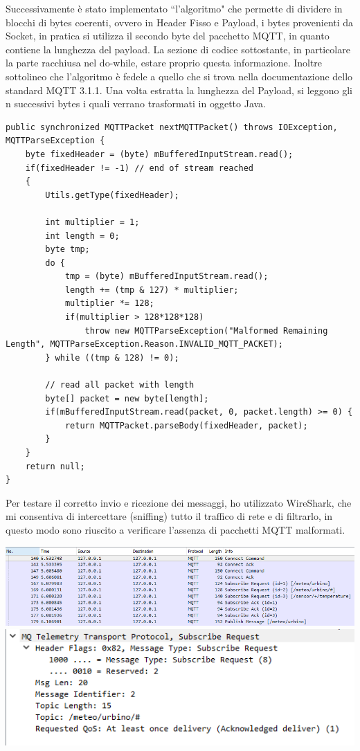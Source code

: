 \documentclass{article}
\begin{document}
Successivamente è stato implementato ``l'algoritmo" che permette di dividere in blocchi di bytes coerenti, ovvero in Header Fisso e Payload, i bytes provenienti da Socket, in pratica si utilizza il secondo byte del pacchetto MQTT, in quanto contiene la lunghezza del payload. La sezione di codice sottostante, in particolare la parte racchiusa nel do-while, estare proprio questa informazione. Inoltre sottolineo che l'algoritmo è fedele a quello che si trova nella documentazione dello standard MQTT 3.1.1. Una volta estratta la lunghezza del Payload, si leggono gli n successivi bytes i quali verrano trasformati in oggetto Java. 
\begin{lstlisting}[style=JavaStyle]
public synchronized MQTTPacket nextMQTTPacket() throws IOException, MQTTParseException {
	byte fixedHeader = (byte) mBufferedInputStream.read();
	if(fixedHeader != -1) // end of stream reached
	{
		Utils.getType(fixedHeader);
		
		int multiplier = 1;
		int length = 0;
		byte tmp;
		do {
			tmp = (byte) mBufferedInputStream.read();
			length += (tmp & 127) * multiplier;
			multiplier *= 128;
			if(multiplier > 128*128*128)
				throw new MQTTParseException("Malformed Remaining Length", MQTTParseException.Reason.INVALID_MQTT_PACKET);
		} while ((tmp & 128) != 0);
		
		// read all packet with length
		byte[] packet = new byte[length];
		if(mBufferedInputStream.read(packet, 0, packet.length) >= 0) {
			return MQTTPacket.parseBody(fixedHeader, packet);
		}
	}
	return null;
}
\end{lstlisting}
Per testare il corretto invio e ricezione dei messaggi, ho utilizzato WireShark, che mi consentiva di intercettare (sniffing) tutto il traffico di rete e di filtrarlo, in questo modo sono riuscito a verificare l'assenza di pacchetti MQTT malformati.
\begin{center}
	\includegraphics[scale=0.6]{immagini/wireshark1.png}
	\includegraphics[scale=0.6]{immagini/wireshark2.png}
\end{center}
\end{document}
